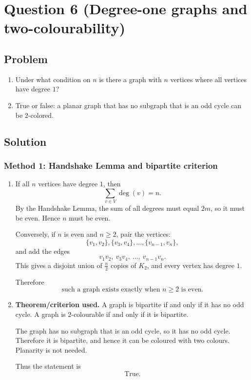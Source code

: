 \documentclass[12pt]{article}
\begin{document}
\newpage
\section{Question 6 (Degree-one graphs and two-colourability)}

\subsection{Problem}
\begin{enumerate}[label=(\alph*)]
  \item Under what condition on $n$ is there a graph with $n$ vertices where all vertices have degree $1$?
  \item True or false: a planar graph that has no subgraph that is an odd cycle can be $2$-colored.
\end{enumerate}

\subsection{Solution}

\subsubsection{Method 1: Handshake Lemma and bipartite criterion}
\begin{enumerate}[label=(\alph*)]
  \item If all $n$ vertices have degree $1$, then
  \[
    \sum_{v\in V}\deg(v)=n.
  \]
  By the Handshake Lemma, the sum of all degrees must equal $2m$, so it must be even. Hence $n$ must be even.

  Conversely, if $n$ is even and $n\ge 2$, pair the vertices:
  \[
    \{v_1,v_2\},\{v_3,v_4\},\dots,\{v_{n-1},v_n\},
  \]
  and add the edges
  \[
    v_1v_2,\ v_3v_4,\ \dots,\ v_{n-1}v_n.
  \]
  This gives a disjoint union of $\frac n2$ copies of $K_2$, and every vertex has degree $1$.

  Therefore
  \[
    \boxed{\text{such a graph exists exactly when }n\ge 2\text{ is even}.}
  \]

  \item \textbf{Theorem/criterion used.} A graph is bipartite if and only if it has no odd cycle. A graph is $2$-colourable if and only if it is bipartite.

  The graph has no subgraph that is an odd cycle, so it has no odd cycle. Therefore it is bipartite, and hence it can be coloured with two colours. Planarity is not needed.

  Thus the statement is
  \[
    \boxed{\text{True}.}
  \]
\end{enumerate}
\end{document}
